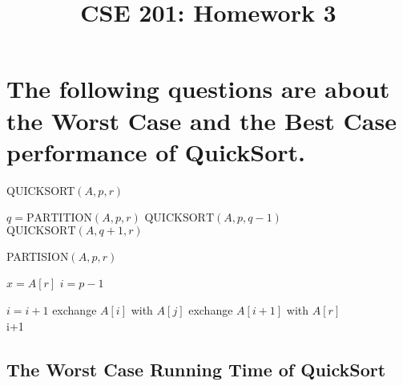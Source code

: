 \documentclass[a4paper]{article}
\title{CSE 201: Homework 3}
\begin{document}
\maketitle
\section{The following questions are about the Worst Case and the Best Case performance of QuickSort. }
\begin{algorithm}
  \caption{QUICKSORT$(A,p,r)$}\label{alg:cap1}
  \begin{algorithmic}[1]
    \State $q =\text{PARTITION}(A,p,r) $
    \State $\text{QUICKSORT}(A,p, q-1)$
    \State $\text{QUICKSORT}(A,q+1,r)$
    \EndIf
  \end{algorithmic}
\end{algorithm}

\begin{algorithm}
  \caption{PARTISION$(A,p,r)$}\label{alg:cap2}
  \begin{algorithmic}[1]
    \State $x=A[r]$
    \State $i=p-1$

    \State $i=i+1$
    \State exchange $A[i]$ with $A[j]$
    \EndIf
    \State exchange $A[i+1]$ with $A[r]$
    \EndFor
    \\
    \Return i+1
  \end{algorithmic}
\end{algorithm}
\subsection{The Worst Case Running Time of QuickSort }
\end{document}
